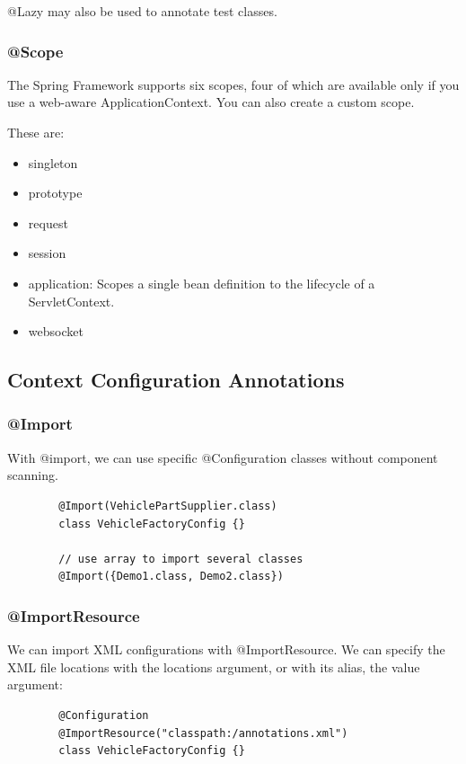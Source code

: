 \documentclass{scrartcl}
\begin{document}
@Lazy may also be used to annotate test classes.
\subsubsection{@Scope}

   The Spring Framework supports six scopes, four of which are available only if you use a web-aware ApplicationContext. You can also create a custom scope.

   These are:

   \begin{itemize}
       \item singleton
       \item    prototype
       \item    request
       \item    session
       \item    application: Scopes a single bean definition to the lifecycle of a ServletContext.
       \item    websocket
   \end{itemize}

\subsection{Context Configuration Annotations}

\subsubsection{@Import}

    With @import, we can use specific @Configuration classes without component scanning.

    \begin{lstlisting}
        @Import(VehiclePartSupplier.class)
        class VehicleFactoryConfig {}

        // use array to import several classes
        @Import({Demo1.class, Demo2.class})
    \end{lstlisting}

\subsubsection{@ImportResource}

    We can import XML configurations with @ImportResource. We can specify the XML file locations with the locations argument, or with its alias, the value argument:

    \begin{lstlisting}
        @Configuration
        @ImportResource("classpath:/annotations.xml")
        class VehicleFactoryConfig {}
    \end{lstlisting}
\end{document}
